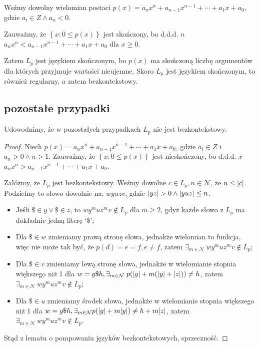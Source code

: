 \documentclass{article}
\theoremstyle{definition}
\theoremstyle{remark}
\begin{document}
Weźmy dowolny wielomian postaci \( p(x)=a_n x^n + a_{n-1}x^{n-1} + \cdots + a_1x + a_0\), gdzie \(a_i \in Z \land a_n < 0\).

Zauważmy, że \(\left\{ x: 0 \leq p(x) \right\}\) jest skończony, bo d.d.d. \(n\) \(a_n x^n < a_{n-1}x^{n-1} + \cdots + a_1x + a_0\) dla \(x \geq 0\).

Zatem \(L_p\) jest językiem skończonym, bo \(p(x)\) ma skończoną liczbę argumentów
dla których przyjmuje wartości nieujemne.
Skoro \(L_p\) jest językiem skończonym, to również regularny, a zatem bezkontekstowy.

\subsection{pozostałe przypadki}

Udowodnimy, że w pozostałych przypadkach \(L_p\) nie jest bezkontekstowy.

\begin{proof}

Niech \(p(x)=a_n x^n + a_{n-1}x^{n-1} + \cdots + a_1x + a_0\), gdzie \(a_i \in Z\) i \(a_n > 0 \land n>1\).
Zauważmy, że \(\left\{ x: 0 \leq p(x) \right\}\) jest nieskończony,
bo d.d.d. \(x\) \(a_n x^n > a_{n-1}x^{n-1} + \cdots + a_1x + a_0\).

Załóżmy, że \(L_p\) jest bezkontekstowy. Weźmy dowolne \(c \in L_p, n \in \mathcal{N}\),
że \(n \leq \abs{c}\).
Podzielmy to słowo dowolnie na:
\(w y u z v\), gdzie \(\abs{yz} > 0 \land \abs{yuz} \leq n\).

\begin{itemize}

\item Jeśli \(\$ \in y \lor \$ \in z\), to \(w y^m u z^m v \not \in L_p\) dla \(m \geq 2\), gdyż każde słowo
z \(L_p\) ma dokładnie jedną literę `\$';

\item Dla \(\$ \in w\) zmieniamy prawą stronę słowa, jednakże wielomian to funkcja,
więc nie może tak być, że \(p(d)=e=f, e \neq f\),
zatem \(\exists_{m \in \mathcal{N}} \ w y^m u z^m v \not \in L_p\);

\item Dla \(\$ \in v\) zmieniamy lewą stronę słowa, jednakże w wielomianie stopnia większego niż 1
dla \(w = g \$ h, \exists_{m \in \mathcal{N}} \ p(\abs{g} + m(\abs{y} + \abs{z})) \neq h\),
zatem \(\exists_{m \in \mathcal{N}} \ w y^m u z^m v \not \in L_p\);

\item Dla \(\$ \in u\) zmieniamy środek słowa, jednakże w wielomianie stopnia większego niż 1
dla \(w = g \$ h, \exists_{m \in \mathcal{N}} p(\abs{g} + m \abs{y}) \neq h + m \abs{z}\),
zatem \(\exists_{m \in \mathcal{N}} \ w y^m u z^m v \not \in L_p\).

\end{itemize}

Stąd z lematu o pompowaniu języków bezkontekstowych, sprzeczność.

\end{proof}
\end{document}
